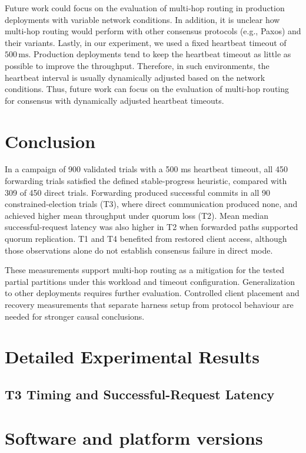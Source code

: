 \documentclass[11pt,a4paper]{article}
\begin{document}
Future work could focus on the evaluation of multi-hop routing in production deployments with variable network conditions.
In addition, it is unclear how multi-hop routing would perform with other consensus protocols (e.g., Paxos) and their variants. 
Lastly, in our experiment, we used a fixed heartbeat timeout of $500\,\mathrm{ms}$. 
Production deployments tend to keep the heartbeat timeout as little as possible to improve the throughput.
Therefore, in such environments, the heartbeat interval is usually dynamically adjusted based on the network conditions. 
Thus, future work can focus on the evaluation of multi-hop routing for consensus with dynamically adjusted heartbeat timeouts.
\section{Conclusion}

In a campaign of 900 validated trials with a 500 ms heartbeat timeout, all 450 forwarding trials satisfied the defined stable-progress heuristic, compared with 309 of 450 direct trials. Forwarding produced successful commits in all 90 constrained-election trials (T3), where direct communication produced none, and achieved higher mean throughput under quorum loss (T2). Mean median successful-request latency was also higher in T2 when forwarded paths supported quorum replication. T1 and T4 benefited from restored client access, although those observations alone do not establish consensus failure in direct mode.

These measurements support multi-hop routing as a mitigation for the tested partial partitions under this workload and timeout configuration. Generalization to other deployments requires further evaluation. Controlled client placement and recovery measurements that separate harness setup from protocol behaviour are needed for stronger causal conclusions.

\newpage



\clearpage
\appendix
\section{Detailed Experimental Results}
\label{app:results}

\clearpage
\subsection{T3 Timing and Successful-Request Latency}



\clearpage
\section{Software and platform versions}
\label{app:software}

\end{document}
